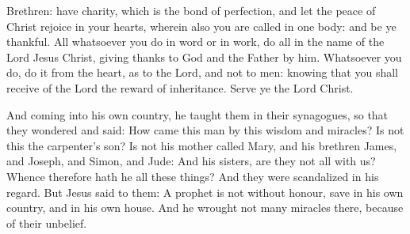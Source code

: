 \columnbreak




Brethren: have charity, which is the bond of
perfection,
and let the peace of Christ rejoice in your hearts, wherein also
you are called in one body: and be ye thankful.
All whatsoever you do in word or in work, do all in the name of
the Lord Jesus Christ, giving thanks to God and the Father by him.
Whatsoever you do, do it from the heart, as to the Lord, and not
to men:
knowing that you shall receive of the Lord the reward of
inheritance. Serve ye the Lord Christ.




And coming into his own country, he taught them in their
synagogues, so that they wondered and said: How came this man by this
wisdom and miracles?
Is not this the carpenter's son? Is not his mother called Mary,
and his brethren James, and Joseph, and Simon, and Jude:
And his sisters, are they not all with us? Whence therefore hath
he all these things?
And they were scandalized in his regard. But Jesus said to them:
A prophet is not without honour, save in his own country, and in his own
house.
And he wrought not many miracles there, because of their
unbelief.







